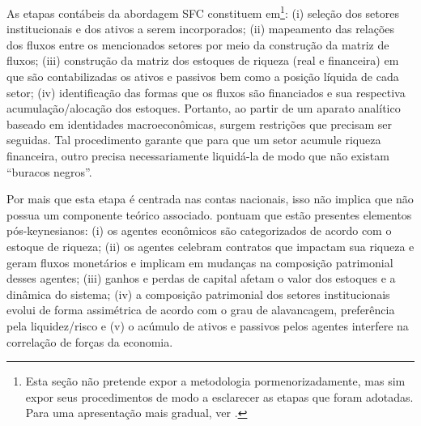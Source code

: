 As etapas contábeis da abordagem SFC constituem em\footnote{Esta seção não pretende expor a metodologia pormenorizadamente, mas sim expor seus procedimentos de modo a esclarecer as etapas que foram adotadas. Para uma apresentação mais gradual, ver \textcite[Capítulo 4]{da_silveira_politica_2017}.}: (i) seleção dos setores institucionais e dos ativos a serem incorporados; (ii) mapeamento das relações dos fluxos entre os mencionados setores por meio da construção da matriz de fluxos; (iii) construção da matriz dos estoques de riqueza (real e financeira) em que são contabilizadas os ativos e passivos  bem como a posição líquida de cada setor; (iv) identificação das formas que os fluxos são financiados e sua respectiva acumulação/alocação dos estoques. Portanto, ao partir de um aparato analítico baseado em identidades macroeconômicas, surgem restrições que precisam ser seguidas.
Tal procedimento garante que para que um setor acumule riqueza financeira, outro precisa necessariamente liquidá-la de modo que não existam ``buracos negros''.

Por mais que esta etapa é centrada nas contas nacionais, isso não implica que não possua um componente teórico associado. \textcite[p.~15--16]{macedo_e_silva_peering_2011}  pontuam que estão presentes elementos pós-keynesianos: 
(i) os agentes econômicos são categorizados de acordo com o estoque de riqueza; 
(ii) os agentes celebram contratos que impactam sua riqueza e geram fluxos monetários e implicam em mudanças na composição patrimonial desses agentes; 
(iii) ganhos e perdas de capital afetam o valor dos estoques e a dinâmica do sistema; 
(iv) a composição patrimonial dos setores institucionais evolui de forma assimétrica de acordo com o grau de alavancagem, preferência pela liquidez/risco e 
(v) o acúmulo de ativos e passivos pelos agentes interfere na correlação de forças da economia. 

